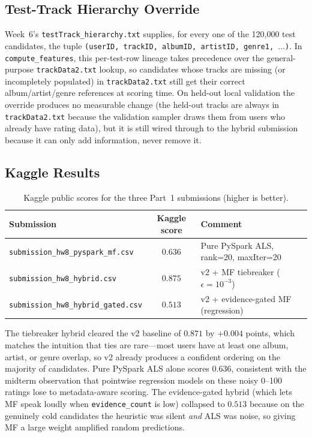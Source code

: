 \documentclass[12pt]{article}
\begin{document}
	\subsection{Test-Track Hierarchy Override}

	Week~6's \texttt{testTrack\_hierarchy.txt} supplies, for every one of the 120{,}000 test candidates, the tuple \texttt{(userID, trackID, albumID, artistID, genre1, $\ldots$)}. In \texttt{compute\_features}, this per-test-row lineage takes precedence over the general-purpose \texttt{trackData2.txt} lookup, so candidates whose tracks are missing (or incompletely populated) in \texttt{trackData2.txt} still get their correct album/artist/genre references at scoring time. On held-out local validation the override produces no measurable change (the held-out tracks are always in \texttt{trackData2.txt} because the validation sampler draws them from users who already have rating data), but it is still wired through to the hybrid submission because it can only add information, never remove it.

	\newpage
	\subsection{Kaggle Results}\label{sec:part1-kaggle}

	\begin{table}[H]
		\centering
		\caption{Kaggle public scores for the three Part~1 submissions (higher is better).}\label{tab:part1-kaggle}
		\begin{tabular}{lcl}
			\toprule
			Submission & Kaggle score & Comment \\
			\midrule
			\texttt{submission\_hw8\_pyspark\_mf.csv}      & $0.636$ & Pure PySpark ALS, rank=20, maxIter=20 \\
			\texttt{submission\_hw8\_hybrid.csv}           & $\mathbf{0.875}$ & v2 + MF tiebreaker ($\epsilon=10^{-3}$) \\
			\texttt{submission\_hw8\_hybrid\_gated.csv}    & $0.513$ & v2 + evidence-gated MF (regression) \\
			\bottomrule
		\end{tabular}
	\end{table}

	The tiebreaker hybrid cleared the v2 baseline of $0.871$ by $+0.004$ points, which matches the intuition that ties are rare---most users have at least one album, artist, or genre overlap, so v2 already produces a confident ordering on the majority of candidates. Pure PySpark ALS alone scores $0.636$, consistent with the midterm observation that pointwise regression models on these noisy 0--100 ratings lose to metadata-aware scoring. The evidence-gated hybrid (which lets MF speak loudly when \texttt{evidence\_count} is low) collapsed to $0.513$ because on the genuinely cold candidates the heuristic was silent \emph{and} ALS was noise, so giving MF a large weight amplified random predictions.
\end{document}
